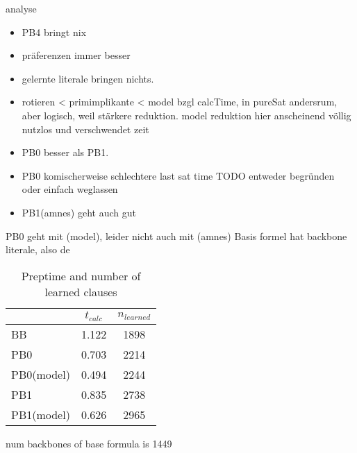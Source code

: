 analyse
\begin{itemize}
\item PB4 bringt nix
\item präferenzen immer besser
\item gelernte literale bringen nichts.
\item rotieren < primimplikante < model bzgl calcTime, in pureSat andersrum, aber logisch, weil stärkere reduktion. model reduktion hier anscheinend völlig nutzlos und verschwendet zeit
\item PB0 besser als PB1. 
\item PB0 komischerweise schlechtere last sat time TODO entweder begründen oder einfach weglassen
\item PB1(amnes) geht auch gut
\end{itemize}
PB0 geht mit (model), leider nicht auch mit (amnes)
Basis formel hat backbone literale, also de


\begin{wraptable}{R}{6cm}
\begin{tabular}{l| c c}
& $t_{calc}$& $n_{learned}$\\
\hline
BB & 1.122 & 1898 \\
PB0 & 0.703 & 2214 \\
PB0(model) & 0.494 & 2244 \\
PB1 & 0.835 & 2738 \\
PB1(model) & 0.626 & 2965 \\
\end{tabular}
\caption{Preptime and number of learned clauses}
\end{wraptable}

num backbones of base formula is 1449


